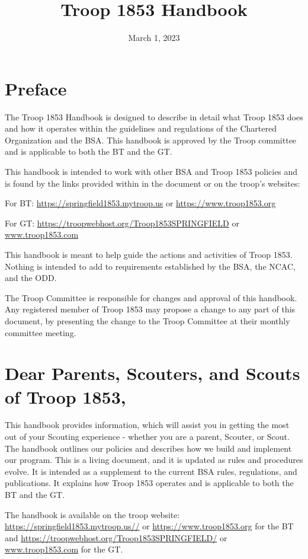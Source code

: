 \documentclass{ltxguide}
\title{Troop 1853 Handbook}
\date{March 1, 2023}
\begin{document}
\maketitle
{}
\newpage

\section*{Preface}
The Troop 1853 Handbook is designed to describe in detail what Troop 1853 does and how it operates within the guidelines and regulations of the Chartered Organization and the \ac{BSA}. This handbook is approved by the Troop committee and is applicable to both the \ac{BT} and the \ac{GT}.

This handbook is intended to work with other \ac{BSA} and Troop 1853 policies and is found by the links provided within in the document or on the troop's websites: 

For \ac{BT}: \url{https://springfield1853.mytroop.us} or \url{https://www.troop1853.org}

For \ac{GT}: \url{https://troopwebhost.org/Troop1853SPRINGFIELD} or \url{www.troop1853.com}

This handbook is meant to help guide the actions and activities of Troop 1853. Nothing is intended to add to requirements established by the \ac{BSA}, the \ac{NCAC}, and the \ac{ODD}.

The Troop Committee is responsible for changes and approval of this handbook. Any registered member of Troop 1853 may propose a change to any part of this document, by presenting the change to the Troop Committee at their monthly committee meeting.

\newpage
\section*{Dear Parents, Scouters, and Scouts of Troop 1853,}

This handbook provides information, which will assist you in getting the most out of your Scouting experience - whether you are a parent, Scouter, or Scout. The handbook outlines our policies and describes how we build and implement our program. This is a living document, and it is updated as rules and procedures evolve. It is intended as a supplement to the current \ac{BSA} rules, regulations, and publications. It explains how Troop 1853 operates and is applicable to both the \ac{BT} and the \ac{GT}.
 
The handbook is available on the troop website:
\url{https://springfield1853.mytroop.us//} or \url{https://www.troop1853.org} for the \ac{BT} and \url{https://troopwebhost.org/Troop1853SPRINGFIELD/} or \url{www.troop1853.com} for the \ac{GT}. 
\end{document}
